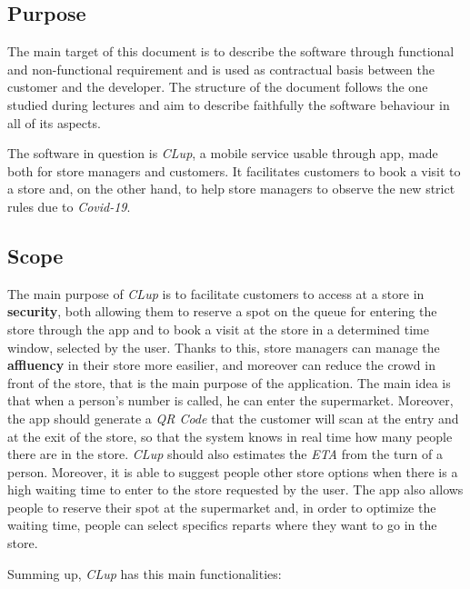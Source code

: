 \documentclass{article}
\begin{document}
	\subsection{Purpose}
	
	The main target of this document is to describe the software through functional and non-functional requirement and is used as contractual basis between the customer and the developer. The structure of the document follows the one studied during lectures and aim to describe faithfully the software behaviour in all of its aspects.
	
	The software in question is \emph{CLup}, a mobile service usable through app, made both for store managers and customers. It facilitates customers to book a visit to a store and, on the other hand, to help store managers to observe the new strict rules due to \emph{Covid-19}.
	
	\subsection{Scope}
	
	The main purpose of \emph{CLup} is to facilitate customers to access at a store in {\bfseries security}, both allowing them to reserve a spot on the queue for entering the store through the app and to book a visit at the store in a determined time window, selected by the user. Thanks to this, store managers can manage the {\bfseries affluency} in their store more easilier, and moreover can reduce the crowd in front of the store, that is the main purpose of the application. The main idea is that when a person's number is called, he can enter the supermarket. Moreover, the app should generate a \emph{QR Code} that the customer will scan at the entry and at the exit of the store, so that the system knows in real time how many people there are in the store. \emph{CLup} should also estimates the \emph{ETA} from the turn of a person. Moreover, it is able to suggest people other store options when there is a high waiting time to enter to the store requested by the user. The app also allows people to reserve their spot at the supermarket and, in order to optimize the waiting time, people can select specifics reparts where they want to go in the store.
	
	Summing up, \emph{CLup} has this main functionalities:
	
	\smallskip
	
\end{document}
